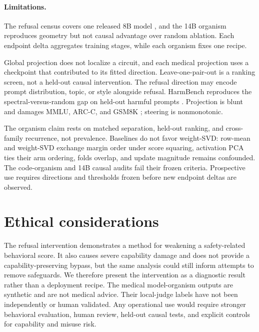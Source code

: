 \paragraph{Limitations.}
The refusal census covers one released 8B model \citep{grattafiori2024llama3},
and the 14B organism reproduces geometry but not causal advantage over random
ablation. Each endpoint delta aggregates training stages, while each organism
fixes one recipe.

Global projection does not localize a circuit, and each medical projection uses
a checkpoint that contributed to its fitted direction. Leave-one-pair-out is a
ranking screen, not a held-out causal intervention. The refusal direction may encode prompt
distribution, topic, or style alongside refusal. HarmBench reproduces the spectral-versus-random gap on
held-out harmful prompts \citep{mazeika2024harmbench}. Projection is blunt and
damages MMLU, ARC-C, and GSM8K
\citep{hendrycks2021mmlu,cobbe2021gsm8k,clark2018arc}; steering is nonmonotonic.

The organism claim rests on matched separation, held-out ranking, and
cross-family recurrence, not prevalence. Baselines do not favor weight-SVD:
row-mean and weight-SVD exchange margin order under score squaring, activation
PCA ties their arm ordering, folds overlap, and update magnitude remains
confounded. The code-organism and 14B causal audits fail their frozen criteria.
Prospective use requires directions and
thresholds frozen before new endpoint deltas are observed.

\section*{Ethical considerations}
The refusal intervention demonstrates a method for weakening a safety-related
behavioral score. It also causes severe capability damage and does not provide a
capability-preserving bypass, but the same analysis could still inform attempts
to remove safeguards. We therefore present the intervention as a diagnostic
result rather than a deployment recipe. The medical model-organism outputs are
synthetic and are not medical advice. Their local-judge labels have not been
independently or human validated. Any operational use would require stronger behavioral
evaluation, human review, held-out causal tests, and explicit controls for
capability and misuse risk.
